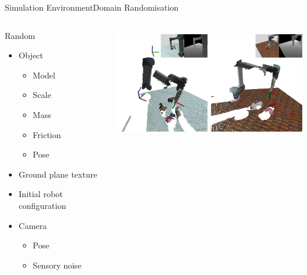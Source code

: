 \begin{frame}{Simulation Environment}{Domain Randomisation}
    \begin{columns}%
        \begin{column}{0.35\textwidth}%
            \begin{block}{Random}
                \begin{itemize}
                    \item Object
                          \begin{itemize}
                              \item Model
                              \item Scale
                              \item Mass
                              \item Friction
                              \item Pose
                          \end{itemize}
                    \item Ground plane texture
                    \item Initial robot configuration
                    \item Camera
                          \begin{itemize}
                              \item Pose
                              \item Sensory noise
                          \end{itemize}
                \end{itemize}
            \end{block}
        \end{column}
        \begin{column}{0.65\textwidth}%
            \centering
            \includegraphics[height=4.75cm]{graphics/random_camera_pose.png}
        \end{column}
    \end{columns}
\end{frame}

